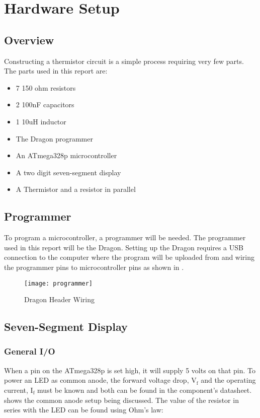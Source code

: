 \documentclass[main.tex]{subfiles}
\begin{document}
\chapter{Hardware Setup}
	\section{Overview}
	Constructing a thermistor circuit is a simple process requiring very few parts. The parts
	used in this report are:
	\begin{itemize}
		\item 7 150 ohm resistors
		\item 2 100nF capacitors
		\item 1 10uH inductor
		\item The Dragon programmer
		\item An ATmega328p microcontroller
		\item A two digit seven-segment display
		\item A Thermistor and a resistor in parallel
	\end{itemize}
	
	
	\section{Programmer}
	To program a microcontroller, a programmer will be needed. The programmer used in this report
	will be the Dragon. Setting up the Dragon requires a USB connection to the computer where
	the program will be uploaded from and wiring the programmer pins to microcontroller pins
	as shown in .
	\begin{figure}[H]
		\begin{center}
			\texttt{[image: programmer]}
		\end{center}
		\caption{Dragon Header Wiring}
		\label{fig:programmer}
	\end{figure}	


	\section{Seven-Segment Display}
		\subsection{General I/O}
		When a pin on the ATmega328p is set high, it will supply 5 volts on that pin. To power an
		LED as common anode, the forward voltage drop, V$_{\text{f}}$ and the operating current,
		I$_{\text{f}}$ must be known and both can be found in the component's datasheet. 
		shows the common anode setup being discussed. The value of the resistor in series with the
		LED can be found using Ohm's law: 
		
\end{document}
